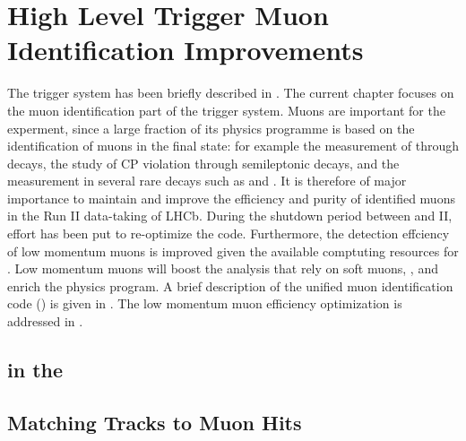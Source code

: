 \chapter{High Level Trigger Muon Identification Improvements}
\label{Muon_id_hlt}

The \lhcb trigger system has been briefly described in . The current chapter focuses on the muon identification
part of the trigger system. Muons are important for the \lhcb experment, since a large fraction of its physics programme is based on
the identification of muons in the final state: for example the measurement of \phis through \BsJpsiPhi decays, the study of CP
violation through semileptonic decays, and the measurement
in several rare decays such as \BdKstmumu and \Bsmm. It is therefore of major importance to maintain and improve the efficiency
and purity of identified muons in the Run II data-taking of LHCb. During the shutdown period between \runone and II, effort has
been put to re-optimize the \muonID code. Furthermore, the detection effciency of low momentum muons is improved given the available
comptuting resources for \runtwo. Low momentum muons will boost the analysis that rely on soft muons, ,
and enrich the \lhcb physics program. A brief description of the unified muon identification code (\muonID) is given in .
The low momentum muon efficiency optimization is addressed in .

\section{\hltone \muonID in the \lhc \runtwo}
\label{muid_hlt1}


\section{Matching \velo Tracks to Muon Hits}
\label{mvm_algorrithm}

